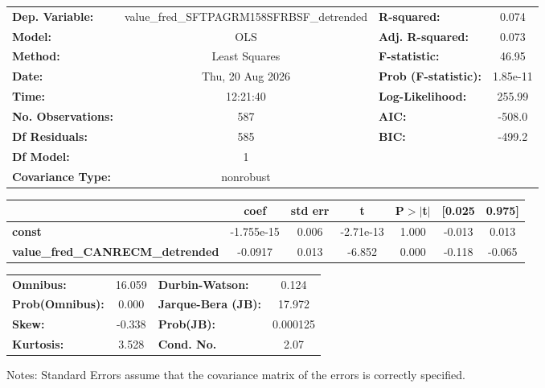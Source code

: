 \begin{center}
\begin{tabular}{lclc}
\toprule
\textbf{Dep. Variable:}                  & value\_fred\_SFTPAGRM158SFRBSF\_detrended & \textbf{  R-squared:         } &     0.074   \\
\textbf{Model:}                          &                    OLS                    & \textbf{  Adj. R-squared:    } &     0.073   \\
\textbf{Method:}                         &               Least Squares               & \textbf{  F-statistic:       } &     46.95   \\
\textbf{Date:}                           &              Thu, 20 Aug 2026             & \textbf{  Prob (F-statistic):} &  1.85e-11   \\
\textbf{Time:}                           &                  12:21:40                 & \textbf{  Log-Likelihood:    } &    255.99   \\
\textbf{No. Observations:}               &                      587                  & \textbf{  AIC:               } &    -508.0   \\
\textbf{Df Residuals:}                   &                      585                  & \textbf{  BIC:               } &    -499.2   \\
\textbf{Df Model:}                       &                        1                  & \textbf{                     } &             \\
\textbf{Covariance Type:}                &                 nonrobust                 & \textbf{                     } &             \\
\bottomrule
\end{tabular}
\begin{tabular}{lcccccc}
                                         & \textbf{coef} & \textbf{std err} & \textbf{t} & \textbf{P$> |$t$|$} & \textbf{[0.025} & \textbf{0.975]}  \\
\midrule
\textbf{const}                           &   -1.755e-15  &        0.006     & -2.71e-13  &         1.000        &       -0.013    &        0.013     \\
\textbf{value\_fred\_CANRECM\_detrended} &      -0.0917  &        0.013     &    -6.852  &         0.000        &       -0.118    &       -0.065     \\
\bottomrule
\end{tabular}
\begin{tabular}{lclc}
\textbf{Omnibus:}       & 16.059 & \textbf{  Durbin-Watson:     } &    0.124  \\
\textbf{Prob(Omnibus):} &  0.000 & \textbf{  Jarque-Bera (JB):  } &   17.972  \\
\textbf{Skew:}          & -0.338 & \textbf{  Prob(JB):          } & 0.000125  \\
\textbf{Kurtosis:}      &  3.528 & \textbf{  Cond. No.          } &     2.07  \\
\bottomrule
\end{tabular}
\end{center}

Notes: \newline
 [1] Standard Errors assume that the covariance matrix of the errors is correctly specified.
